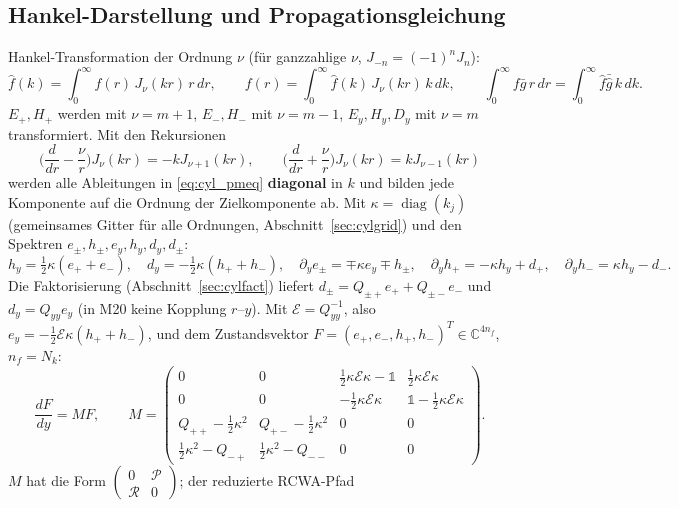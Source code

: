 \subsection{Hankel-Darstellung und Propagationsgleichung}
Hankel-Transformation der Ordnung $\nu$ (für ganzzahlige $\nu$, $J_{-n}=(-1)^nJ_n$):
\begin{equation}
  \hat f(k)=\int_0^\infty f(r)\,J_\nu(kr)\,r\,dr,\qquad f(r)=\int_0^\infty\hat f(k)\,J_\nu(kr)\,k\,dk,\qquad
  \int_0^\infty f\bar g\,r\,dr=\int_0^\infty\hat f\bar{\hat g}\,k\,dk .
  \label{eq:hankel}
\end{equation}
$E_+,H_+$ werden mit $\nu=m+1$, $E_-,H_-$ mit $\nu=m-1$, $E_y,H_y,D_y$ mit $\nu=m$ transformiert. Mit den
Rekursionen
\begin{equation}
  \Big(\frac{d}{dr}-\frac\nu r\Big)J_\nu(kr)=-kJ_{\nu+1}(kr),\qquad \Big(\frac{d}{dr}+\frac\nu r\Big)J_\nu(kr)=kJ_{\nu-1}(kr)
  \label{eq:besselrec}
\end{equation}
werden alle Ableitungen in \eqref{eq:cyl_pmeq} \textbf{diagonal} in $k$ und bilden jede Komponente auf die Ordnung
der Zielkomponente ab. Mit $\kappa=\operatorname{diag}(k_j)$ (gemeinsames Gitter für alle Ordnungen,
Abschnitt~\ref{sec:cylgrid}) und den Spektren $e_\pm,h_\pm,e_y,h_y,d_y,d_\pm$:
\begin{equation}
  h_y=\tfrac12\kappa(e_++e_-),\quad d_y=-\tfrac12\kappa(h_++h_-),\quad
  \partial_ye_\pm=\mp\kappa e_y\mp h_\pm,\quad \partial_yh_+=-\kappa h_y+d_+,\quad\partial_yh_-=\kappa h_y-d_- .
  \label{eq:cyl_spec}
\end{equation}
Die Faktorisierung (Abschnitt~\ref{sec:cylfact}) liefert $d_\pm=Q_{\pm+}e_++Q_{\pm-}e_-$ und $d_y=Q_{yy}e_y$
(in M20 keine Kopplung $r$--$y$). Mit $\mathcal E=Q_{yy}^{-1}$, also $e_y=-\tfrac12\mathcal E\kappa(h_++h_-)$, und dem
Zustandsvektor $F=(e_+,e_-,h_+,h_-)^T\in\mathbb C^{4n_f}$, $n_f=N_k$:
\begin{equation}
  \frac{dF}{dy}=M F,\qquad
  M=\begin{pmatrix}0&0&\tfrac12\kappa\mathcal E\kappa-\mathbb 1&\tfrac12\kappa\mathcal E\kappa\\
  0&0&-\tfrac12\kappa\mathcal E\kappa&\mathbb 1-\tfrac12\kappa\mathcal E\kappa\\
  Q_{++}-\tfrac12\kappa^2&Q_{+-}-\tfrac12\kappa^2&0&0\\
  \tfrac12\kappa^2-Q_{-+}&\tfrac12\kappa^2-Q_{--}&0&0\end{pmatrix}.
  \label{eq:cyl_M}
\end{equation}
$M$ hat die Form $\begin{pmatrix}0&\mathcal P\\\mathcal R&0\end{pmatrix}$; der reduzierte RCWA-Pfad
